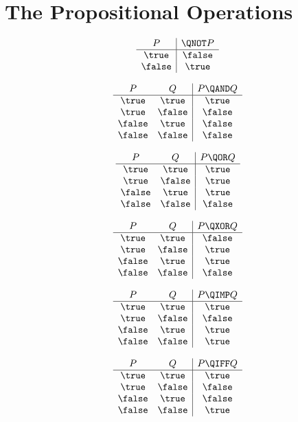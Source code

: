 \documentclass[handout]{mcs}
\begin{document}
\section*{The Propositional Operations}

\[
\begin{array}{c|c}
P & \QNOT P \\ \hline
\true & \false \\
\false & \true \\
\end{array}
\]

\[
\begin{array}{cc|c}
P & Q & P \QAND Q \\ \hline
\true & \true & \true \\
\true & \false & \false \\
\false & \true & \false \\
\false & \false & \false
\end{array}
\]


\[
\begin{array}{cc|c}
P & Q & P \QOR Q \\ \hline
\true & \true & \true \\
\true & \false & \true \\
\false & \true & \true \\
\false & \false & \false
\end{array}
\]

\[
\begin{array}{cc|c}
P & Q & P \QXOR Q \\ \hline
\true & \true & \false \\
\true & \false & \true \\
\false & \true & \true \\
\false & \false & \false
\end{array}
\]

\[
\begin{array}{cc|c}
    P  &   Q    & P \QIMP Q \\ \hline
\true  & \true  & \true \\
\true  & \false & \false \\
\false & \true  & \true \\
\false & \false & \true  
\end{array}
\]

\[
\begin{array}{cc|c}
P & Q & P \QIFF Q \\ \hline
\true & \true & \true \\
\true & \false & \false \\
\false & \true & \false \\
\false & \false & \true
\end{array}
\]
\end{document}
